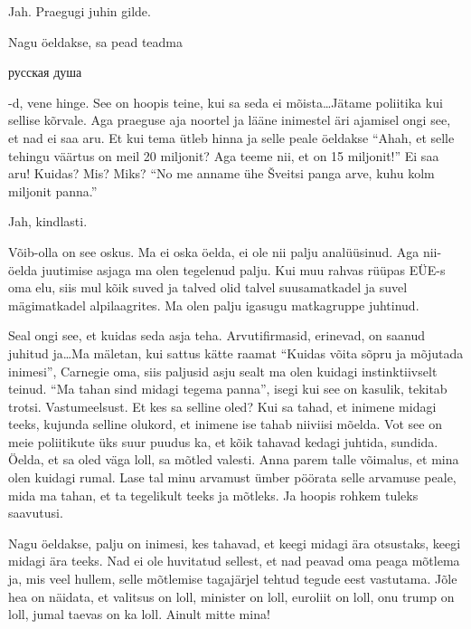 Jah. Praegugi juhin gilde. 


Nagu öeldakse, sa pead teadma \begin{russian}русская душа\end{russian}-d, vene 
hinge. 
See on hoopis teine, kui sa seda ei mõista\ldots Jätame poliitika kui sellise 
kõrvale. Aga  praeguse aja noortel ja lääne inimestel äri ajamisel ongi see, et 
nad ei saa aru. Et kui tema ütleb hinna ja selle peale öeldakse \enquote{Ahah, 
et selle tehingu väärtus on meil 20 miljonit? Aga teeme nii, et on 15 
miljonit!} Ei saa aru! Kuidas? Mis? Miks? \enquote{No me anname ühe Šveitsi 
panga arve, kuhu kolm miljonit panna.}
                 

Jah, kindlasti.


Võib-olla on see oskus. Ma ei oska öelda, ei ole nii palju analüüsinud. Aga 
nii-öelda juutimise asjaga ma olen tegelenud palju. Kui muu rahvas rüüpas EÜE-s 
oma elu, siis mul kõik suved ja talved olid talvel suusamatkadel ja suvel 
mägimatkadel alpilaagrites. Ma olen palju igasugu matkagruppe juhtinud.

Seal ongi see, et kuidas seda asja teha. Arvutifirmasid, erinevad, on saanud 
juhitud ja\ldots Ma mäletan, kui  sattus kätte raamat \enquote{Kuidas võita 
sõpru ja mõjutada inimesi}, Carnegie oma, siis paljusid asju 
sealt ma olen kuidagi instinktiivselt teinud. \enquote{Ma tahan sind midagi 
tegema panna}, isegi kui see on kasulik, tekitab trotsi. Vastumeelsust. Et kes 
sa selline oled? Kui sa tahad, et inimene midagi teeks, kujunda selline 
olukord, et inimene ise tahab niiviisi mõelda. Vot see on meie poliitikute üks 
suur puudus ka, et kõik tahavad kedagi juhtida, sundida. Öelda, et sa oled väga 
loll, sa mõtled valesti. Anna parem talle võimalus, et mina olen kuidagi rumal. 
Lase tal minu arvamust ümber pöörata selle arvamuse peale, mida ma tahan, et ta 
tegelikult teeks ja mõtleks. Ja hoopis rohkem tuleks  saavutusi. 

Nagu öeldakse, palju on inimesi, kes tahavad, et  keegi midagi ära otsustaks, 
keegi midagi ära teeks. Nad ei ole huvitatud sellest, et nad peavad oma peaga 
mõtlema ja, mis veel hullem, selle mõtlemise tagajärjel tehtud tegude eest 
vastutama. Jõle hea on näidata, et valitsus on loll, minister on loll, euroliit 
on loll, onu trump on loll, jumal taevas on ka loll. Ainult mitte mina!
                 
